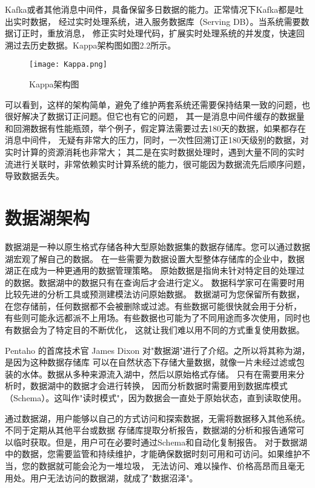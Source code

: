 Kafka或者其他消息中间件，具备保留多日数据的能力。正常情况下Kafka都是吐出实时数据，
经过实时处理系统，进入服务数据库（Serving DB）。当系统需要数据订正时，重放消息，
修正实时处理代码，扩展实时处理系统的并发度，快速回溯过去历史数据。Kappa架构图如图2.2所示。

\begin{figure}[h]
  \centering
  \texttt{[image: Kappa.png]}
  \caption{Kappa架构图}
  \label{fig:badge}
\end{figure}

可以看到，这样的架构简单，避免了维护两套系统还需要保持结果一致的问题，也很好解决了数据订正问题。但它也有它的问题，
其一是消息中间件缓存的数据量和回溯数据有性能瓶颈，举个例子，假定算法需要过去180天的数据，如果都存在消息中间件，
无疑有非常大的压力，同时，一次性回溯订正180天级别的数据，对实时计算的资源消耗也非常大；
其二是在实时数据处理时，遇到大量不同的实时流进行关联时，非常依赖实时计算系统的能力，很可能因为数据流先后顺序问题，导致数据丢失。

\section{数据湖架构}

数据湖是一种以原生格式存储各种大型原始数据集的数据存储库。您可以通过数据湖宏观了解自己的数据。
在一些需要为数据设置大型整体存储库的企业中，数据湖正在成为一种更通用的数据管理策略。
原始数据是指尙未针对特定目的处理过的数据。数据湖中的数据只有在查询后才会进行定义。
数据科学家可在需要时用比较先进的分析工具或预测建模法访问原始数据。
数据湖可为您保留所有数据，在您存储前，任何数据都不会被删除或过滤。有些数据可能很快就会用于分析，
有些则可能永远都派不上用场。有些数据也可能为了不同用途而多次使用，同时也有数据会为了特定目的不断优化，
这就让我们难以用不同的方式重复使用数据。

Pentaho 的首席技术官 James Dixon 对"数据湖"进行了介绍。之所以将其称为湖，是因为这种数据存储库
可以在自然状态下存储大量数据，就像一片未经过滤或包装的水体。数据从多种来源流入湖中，然后以原始格式存储。
只有在需要用来分析时，数据湖中的数据才会进行转换，
因而分析数据时需要用到数据库模式（Schema）。这叫作"读时模式"，因为数据会一直处于原始状态，直到读取使用。

通过数据湖，用户能够以自己的方式访问和探索数据，无需将数据移入其他系统。不同于定期从其他平台或数据
存储库提取分析报告，数据湖的分析和报告通常可以临时获取。但是，用户可在必要时通过Schema和自动化复制报告。
对于数据湖中的数据，您需要监管和持续维护，才能确保数据时刻可用和可访问。如果维护不当，您的数据就可能会沦为一堆垃圾，
无法访问、难以操作、价格高昂而且毫无用处。用户无法访问的数据湖，就成了"数据沼泽"。

